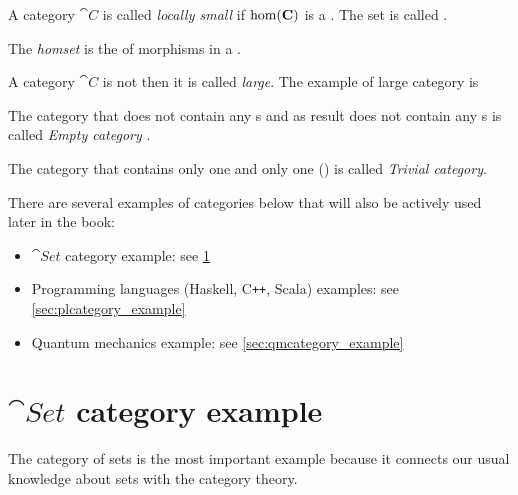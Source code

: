 \begin{definition}
\label{def:localy_small_category}

A category $\cat{C}$ is called \textit{locally small} if 
$\mathrm{hom}(\mathbf{C})$ is a . The set is called .
\end{definition}

\begin{definition}[Homset]
\label{def:homset}
The \textit{homset} is the  of morphisms in a
. 
\end{definition}


\begin{definition}
\label{def:large_category}
A category $\cat{C}$ is not  then it is
called \textit{large}. The example of large category is
\end{definition}

\begin{definition}
\label{def:empty_category}
The category that does not contain any s and as
result does not contain any s is called
\textit{Empty category} \cite{bib:stackexchange:empty_category}.
\end{definition}

\begin{definition}
\label{def:trivial_category}
The category that contains only one  and only
one  ()  is called
\textit{Trivial category}.
\end{definition}

There are several examples of categories below that will also be
actively used later in the book:
\begin{itemize}
\item $\cat{Set}$ category example: see \cref{sec:setcategory_example}
\item Programming languages (Haskell, C\texttt{++}, Scala) examples: see
  \cref{sec:plcategory_example}
\item Quantum mechanics example: see \cref{sec:qmcategory_example}
\end{itemize}

\section{$\cat{Set}$ category example}
\label{sec:setcategory_example}
The category of sets is the most important example because it
connects our usual knowledge about sets with the category theory. 

